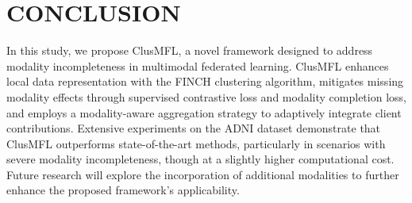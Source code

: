 \section{CONCLUSION}
In this study, we propose ClusMFL, a novel framework designed to address modality incompleteness in multimodal federated learning. ClusMFL enhances local data representation with the FINCH clustering algorithm, mitigates missing modality effects through supervised contrastive loss and modality completion loss, and employs a modality-aware aggregation strategy to adaptively integrate client contributions. Extensive experiments on the ADNI dataset demonstrate that ClusMFL outperforms state-of-the-art methods, particularly in scenarios with severe modality incompleteness, though at a slightly higher computational cost. Future research will explore the incorporation of additional modalities to further enhance the proposed framework's applicability.
